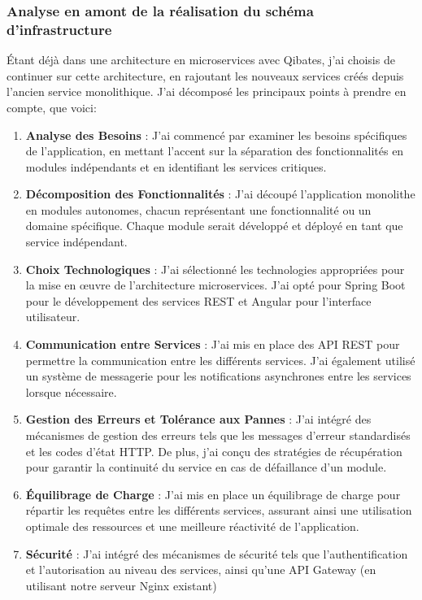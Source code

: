 \documentclass[a4paper, 11pt]{report}
\begin{document}
\subsubsection{Analyse en amont de la réalisation du schéma d'infrastructure}
Étant déjà dans une architecture en microservices avec Qibates,
j'ai choisis de continuer sur cette architecture, en rajoutant les nouveaux services créés depuis l'ancien service monolithique.
J'ai décomposé les principaux points à prendre en compte, que voici:
\begin{enumerate}
\item \textbf{Analyse des Besoins} : J'ai commencé par examiner les besoins spécifiques de l'application,
  en mettant l'accent sur la séparation des fonctionnalités en modules indépendants et en 
  identifiant les services critiques.
\item \textbf{Décomposition des Fonctionnalités} : J'ai découpé
  l'application monolithe en modules autonomes, chacun représentant une
  fonctionnalité ou un domaine spécifique. Chaque module serait
  développé et déployé en tant que service indépendant.
\item \textbf{Choix Technologiques} : J'ai sélectionné les technologies
  appropriées pour la mise en œuvre de l'architecture microservices.
J'ai opté pour Spring Boot pour le développement des services REST et
  Angular pour l'interface utilisateur.
\item \textbf{Communication entre Services} : J'ai mis en place des API REST
  pour permettre la communication entre les différents services. J'ai
  également utilisé un système de messagerie pour les notifications
  asynchrones entre les services lorsque nécessaire.
\item \textbf{Gestion des Erreurs et Tolérance aux Pannes} : J'ai intégré
  des mécanismes de gestion des erreurs tels que les messages d'erreur
  standardisés et les codes d'état HTTP. De plus, j'ai conçu des
  stratégies de récupération pour garantir la continuité du service en
  cas de défaillance d'un module.
\item \textbf{Équilibrage de Charge} : J'ai mis en place un équilibrage de
  charge pour répartir les requêtes entre les différents services,
  assurant ainsi une utilisation optimale des ressources et une
  meilleure réactivité de l'application.
\item \textbf{Sécurité} : J'ai intégré des mécanismes de sécurité tels que
  l'authentification et l'autorisation au niveau des services, ainsi
  qu'une API Gateway (en utilisant notre serveur Nginx existant)

\end{enumerate}
\end{document}
